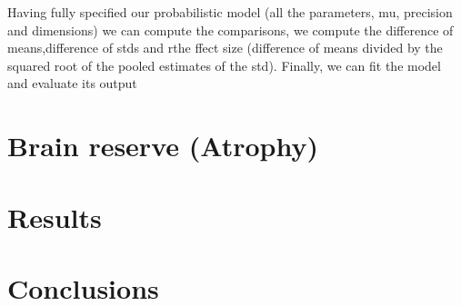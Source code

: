 \documentclass[11pt]{article}
\theoremstyle{definition}
\theoremstyle{remark}
\begin{document}
Having fully specified our probabilistic model (all the parameters, mu, precision and dimensions) we can compute the comparisons, we compute the difference of means,difference of stds and rthe ffect size (difference of means divided by the squared root of the pooled estimates of the std).
Finally, we can fit the model and evaluate its output

\section{Brain reserve (Atrophy)}
\label{se:atro}

\section{Results}
\label{se:res}



\section{Conclusions}
\label{se:con}

\newpage
{}



\end{document}
